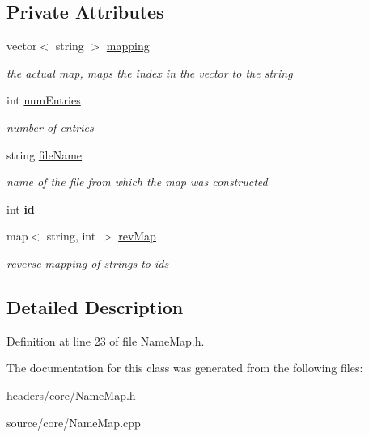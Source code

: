 \subsection*{Private Attributes}
\begin{DoxyCompactItemize}
\item 
\hypertarget{class_name_map_a1acb823b1c1fb7b8d43f7e0e1406dca8}{
vector$<$ string $>$ \hyperlink{class_name_map_a1acb823b1c1fb7b8d43f7e0e1406dca8}{mapping}}
\label{class_name_map_a1acb823b1c1fb7b8d43f7e0e1406dca8}

\begin{DoxyCompactList}\small\item\em the actual map, maps the index in the vector to the string \item\end{DoxyCompactList}\item 
\hypertarget{class_name_map_a647caae861e8a9e8472a033da6c0ad20}{
int \hyperlink{class_name_map_a647caae861e8a9e8472a033da6c0ad20}{numEntries}}
\label{class_name_map_a647caae861e8a9e8472a033da6c0ad20}

\begin{DoxyCompactList}\small\item\em number of entries \item\end{DoxyCompactList}\item 
\hypertarget{class_name_map_acf6827aa9176aa0820a2c7c0ec0cf3a4}{
string \hyperlink{class_name_map_acf6827aa9176aa0820a2c7c0ec0cf3a4}{fileName}}
\label{class_name_map_acf6827aa9176aa0820a2c7c0ec0cf3a4}

\begin{DoxyCompactList}\small\item\em name of the file from which the map was constructed \item\end{DoxyCompactList}\item 
\hypertarget{class_name_map_ab836a5099928fbf10c864504fd658fa8}{
int {\bfseries id}}
\label{class_name_map_ab836a5099928fbf10c864504fd658fa8}

\item 
\hypertarget{class_name_map_aa77ed12b399d2cf5a352c1c988cc7532}{
map$<$ string, int $>$ \hyperlink{class_name_map_aa77ed12b399d2cf5a352c1c988cc7532}{revMap}}
\label{class_name_map_aa77ed12b399d2cf5a352c1c988cc7532}

\begin{DoxyCompactList}\small\item\em reverse mapping of strings to ids \item\end{DoxyCompactList}\end{DoxyCompactItemize}


\subsection{Detailed Description}


Definition at line 23 of file NameMap.h.



The documentation for this class was generated from the following files:\begin{DoxyCompactItemize}
\item 
headers/core/NameMap.h\item 
source/core/NameMap.cpp\end{DoxyCompactItemize}
